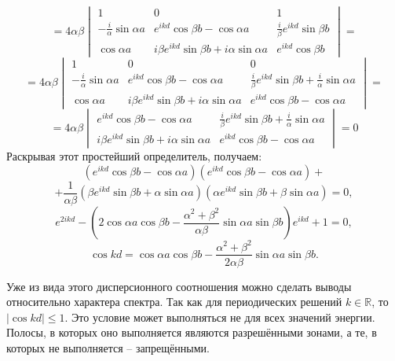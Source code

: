 \[
    =4\alpha\beta
    \begin{vmatrix}
        1 & 0 & 1 \\
        -\frac{i}{\alpha}\sin \alpha a  & e^{ikd}\cos \beta b - \cos\alpha a  &
        \frac{i}{\beta} e^{ikd}\sin\beta b \\
        \cos\alpha a & i\beta e^{ikd} \sin{\beta
    b} + i\alpha\sin\alpha a  &
        e^{ikd}\cos\beta b
    \end{vmatrix}
    =
\]
\[
    =4\alpha\beta
    \begin{vmatrix}
        1 & 0 & 0 \\
        -\frac{i}{\alpha}\sin \alpha a  & e^{ikd}\cos \beta b - \cos\alpha a  &
        \frac{i}{\beta} e^{ikd}\sin\beta b + \frac{i}{\alpha}\sin \alpha a  \\
        \cos\alpha a & i\beta e^{ikd} \sin{\beta
    b} + i\alpha\sin\alpha a  &
        e^{ikd}\cos\beta b-\cos\alpha a
    \end{vmatrix}
    =
\]
\[
    =4\alpha\beta
    \begin{vmatrix}
        e^{ikd}\cos \beta b - \cos\alpha a  &
        \frac{i}{\beta} e^{ikd}\sin\beta b + \frac{i}{\alpha}\sin \alpha a  \\
        i\beta e^{ikd} \sin{\beta b} + i\alpha\sin\alpha a  &
        e^{ikd}\cos\beta b-\cos\alpha a
    \end{vmatrix} = 0
\]
Раскрывая этот простейший определитель, получаем:
\[
    (e^{ikd}\cos \beta b - \cos\alpha a) (e^{ikd}\cos\beta b -
    \cos\alpha a) +
\]
\[
    + \frac{1}{\alpha\beta}(\beta e^{ikd} \sin{\beta b} + \alpha\sin\alpha a)(\alpha
    e^{ikd}\sin\beta b + \beta \sin\alpha a) = 0,
\]
\[
    e^{2ikd} - (2\cos\alpha a \cos\beta b -
    \frac{\alpha^2 + \beta^2}{\alpha\beta}\sin\alpha a \sin\beta b)e^{ikd} +
    1 = 0,
\]
\[
    \cos kd = \cos\alpha a\cos\beta b - \frac{\alpha^2
    +\beta^2}{2\alpha\beta}\sin\alpha a \sin\beta b.
\]

Уже из вида этого дисперсионного соотношения можно сделать выводы относительно
характера спектра. Так как для периодических решений \( k \in \mathbb{R} \),
то \( |\cos kd| \le 1 \). Это условие может выполняться не для всех значений
энергии. Полосы, в которых оно выполняется являются разрешёнными зонами, а те, в
которых не выполняется -- запрещёнными.

